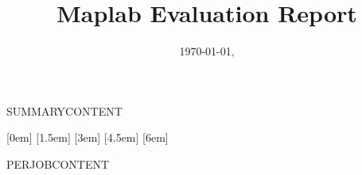 \documentclass{article}
\renewcommand\_{\textunderscore\allowbreak}
\begin{document}
\title{Maplab Evaluation Report}
\author{}
\date{\today, \currenttime}

\maketitle

SUMMARYCONTENT
\pagebreak

\tableofcontents

  [0em]%
  {\addvspace{1em}\bfseries}%
  {\thecontentslabel\hspace*{1em}}%
  {}%
  {\hfill\contentspage}%
  [1.5em]%
  {\bfseries}%
  {\thecontentslabel \hspace*{1em}}%
  {}%
  {\hfill\contentspage}%
  [3em]%
  {}%
  {\thecontentslabel\hspace*{1em}}%
  {}%
  {\contentspage}%
  [4.5em]%
  {}%
  {\thecontentslabel\hspace*{1em}}%
  {}%
  {\contentspage}%
  [6em]%
  {}%
  {\thecontentslabel\hspace*{1em}}%
  {}%
  {\contentspage}%

\renewcommand*{\thesection}{Test~\arabic{section}}
\renewcommand*{\thesubsection}{Test~\arabic{section}.\arabic{subsection}}
\renewcommand*{\thesubsubsection}{\arabic{section}.\arabic{subsection}.\arabic{subsubsection}}

\fancyhead[L]{\leftmark\newline\rightmark}
\fancyfoot[C]{\thepage}
PERJOBCONTENT
\end{document}
